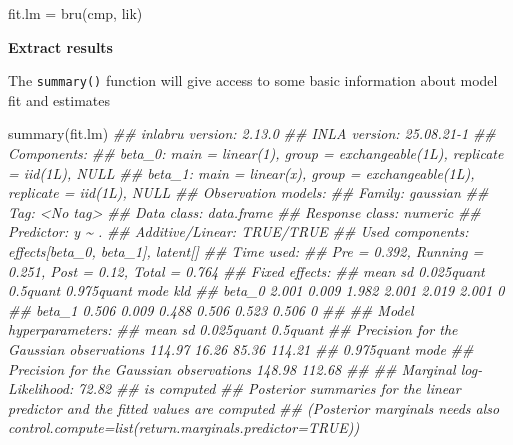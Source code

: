\documentclass[
  letterpaper,
  DIV=11,
  numbers=noendperiod]{scrartcl}
\newenvironment{Shaded}{\begin{snugshade}}{\end{snugshade}}
\newcommand{\DocumentationTok}[1]{\textcolor[rgb]{0.37,0.37,0.37}{\textit{#1}}}
\newcommand{\FunctionTok}[1]{\textcolor[rgb]{0.28,0.35,0.67}{#1}}
\newcommand{\NormalTok}[1]{\textcolor[rgb]{0.00,0.23,0.31}{#1}}
\newcommand{\OtherTok}[1]{\textcolor[rgb]{0.00,0.23,0.31}{#1}}
\begin{document}
\begin{Shaded}
\begin{Highlighting}[]
\NormalTok{fit.lm }\OtherTok{=} \FunctionTok{bru}\NormalTok{(cmp, lik)}
\end{Highlighting}
\end{Shaded}

\textbf{Extract results}

The \texttt{summary()} function will give access to some basic
information about model fit and estimates

\begin{Shaded}
\begin{Highlighting}[]
\FunctionTok{summary}\NormalTok{(fit.lm)}
\DocumentationTok{\#\# inlabru version: 2.13.0}
\DocumentationTok{\#\# INLA version: 25.08.21{-}1}
\DocumentationTok{\#\# Components:}
\DocumentationTok{\#\# beta\_0: main = linear(1), group = exchangeable(1L), replicate = iid(1L), NULL}
\DocumentationTok{\#\# beta\_1: main = linear(x), group = exchangeable(1L), replicate = iid(1L), NULL}
\DocumentationTok{\#\# Observation models:}
\DocumentationTok{\#\#   Family: \textquotesingle{}gaussian\textquotesingle{}}
\DocumentationTok{\#\#     Tag: \textless{}No tag\textgreater{}}
\DocumentationTok{\#\#     Data class: \textquotesingle{}data.frame\textquotesingle{}}
\DocumentationTok{\#\#     Response class: \textquotesingle{}numeric\textquotesingle{}}
\DocumentationTok{\#\#     Predictor: y \textasciitilde{} .}
\DocumentationTok{\#\#     Additive/Linear: TRUE/TRUE}
\DocumentationTok{\#\#     Used components: effects[beta\_0, beta\_1], latent[]}
\DocumentationTok{\#\# Time used:}
\DocumentationTok{\#\#     Pre = 0.392, Running = 0.251, Post = 0.12, Total = 0.764 }
\DocumentationTok{\#\# Fixed effects:}
\DocumentationTok{\#\#         mean    sd 0.025quant 0.5quant 0.975quant  mode kld}
\DocumentationTok{\#\# beta\_0 2.001 0.009      1.982    2.001      2.019 2.001   0}
\DocumentationTok{\#\# beta\_1 0.506 0.009      0.488    0.506      0.523 0.506   0}
\DocumentationTok{\#\# }
\DocumentationTok{\#\# Model hyperparameters:}
\DocumentationTok{\#\#                                           mean    sd 0.025quant 0.5quant}
\DocumentationTok{\#\# Precision for the Gaussian observations 114.97 16.26      85.36   114.21}
\DocumentationTok{\#\#                                         0.975quant   mode}
\DocumentationTok{\#\# Precision for the Gaussian observations     148.98 112.68}
\DocumentationTok{\#\# }
\DocumentationTok{\#\# Marginal log{-}Likelihood:  72.82 }
\DocumentationTok{\#\#  is computed }
\DocumentationTok{\#\# Posterior summaries for the linear predictor and the fitted values are computed}
\DocumentationTok{\#\# (Posterior marginals needs also \textquotesingle{}control.compute=list(return.marginals.predictor=TRUE)\textquotesingle{})}
\end{Highlighting}
\end{Shaded}
\end{document}

